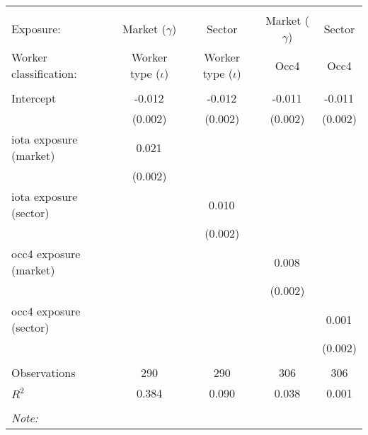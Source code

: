 \begin{tabular}{@{\extracolsep{5pt}}lcccc}
\\[-1.8ex]\hline
\hline \\[-1.8ex]
\hline \\[-1.8ex]
 Exposure: & Market ($\gamma$) & Sector & Market ($\gamma$) & Sector \\
 Worker classification: & Worker type ($\iota$) & Worker type ($\iota$) & Occ4 & Occ4 \\
 \hline &  &  &  &  \\
 Intercept & -0.012$^{}$ & -0.012$^{}$ & -0.011$^{}$ & -0.011$^{}$ \\
  & (0.002) & (0.002) & (0.002) & (0.002) \\
 iota exposure (market) & 0.021$^{}$ & & & \\
  & (0.002) & & & \\
 iota exposure (sector) & & 0.010$^{}$ & & \\
  & & (0.002) & & \\
 occ4 exposure (market) & & & 0.008$^{}$ & \\
  & & & (0.002) & \\
 occ4 exposure (sector) & & & & 0.001$^{}$ \\
  & & & & (0.002) \\
\hline \\[-1.8ex]
 Observations & 290 & 290 & 306 & 306 \\
 $R^2$ & 0.384 & 0.090 & 0.038 & 0.001 \\
\hline
\hline \\[-1.8ex]
\textit{Note:}\end{tabular}